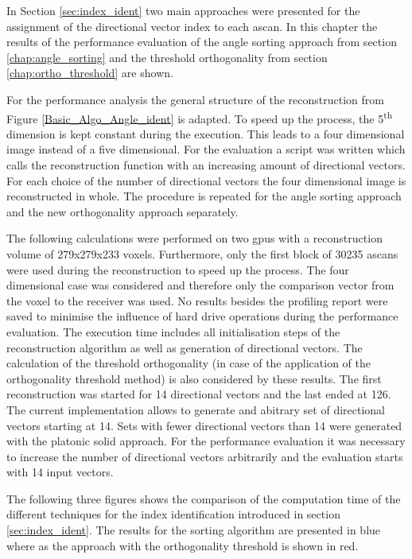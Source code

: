 In Section \ref{sec:index_ident} two main approaches were presented for the assignment of the directional vector index to each \ac{ascan}. In this chapter the results of the performance evaluation of the angle sorting approach from section \ref{chap:angle_sorting} and the threshold orthogonality from section \ref{chap:ortho_threshold} are shown. 

For the performance analysis the general structure of the reconstruction from Figure \ref{Basic_Algo_Angle_ident} is adapted. To speed up the process, the 5\textsuperscript{th} dimension is kept constant during the execution. This leads to a four dimensional image instead of a five dimensional. For the evaluation a script was written which calls the reconstruction function with an increasing amount of directional vectors. For each choice of the number of directional vectors the four dimensional image is reconstructed in whole. The procedure is repeated for the angle sorting approach and the new orthogonality approach separately.

The following calculations were performed on two \acp{gpu} with a reconstruction volume of 279x279x233 voxels. Furthermore, only the first block of 30235 \acp{ascan} were used during the reconstruction to speed up the process. The four dimensional case was considered and therefore only the comparison vector from the voxel to the receiver was used. No results besides the profiling report were saved to minimise the influence of hard drive operations during the performance evaluation. The execution time includes all initialisation steps of the reconstruction algorithm as well as generation of directional vectors. The calculation of the threshold orthogonality (in case of the application of the orthogonality threshold method) is also considered by these results. The first reconstruction was started for 14 directional vectors and the last ended at 126. The current implementation allows to generate and abitrary set of directional vectors starting at 14. Sets with fewer directional vectors than 14 were generated with the platonic solid approach. For the performance evaluation it was necessary to increase the number of directional vectors arbitrarily and the evaluation starts with 14 input vectors.

The following three figures shows the comparison of the computation time of the different techniques for the index identification introduced in section \ref{sec:index_ident}. The results for the sorting algorithm are presented in blue where as the approach with the orthogonality threshold is shown in red.

